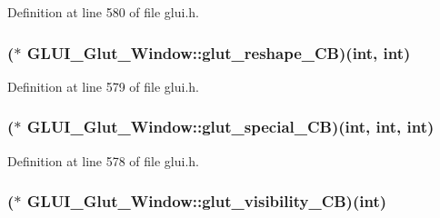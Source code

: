 Definition at line 580 of file glui.\+h.

\hypertarget{class_g_l_u_i___glut___window_ab80f91ef7790e98a3fb96f5d2fc3bcad}{
\subsubsection[{glut\+\_\+reshape\+\_\+\+C\+B}]{($\ast$ G\+L\+U\+I\+\_\+\+Glut\+\_\+\+Window\+::glut\+\_\+reshape\+\_\+\+C\+B)({\bf int}, {\bf int})}}\label{class_g_l_u_i___glut___window_ab80f91ef7790e98a3fb96f5d2fc3bcad}


Definition at line 579 of file glui.\+h.

\hypertarget{class_g_l_u_i___glut___window_a6195cf472a03676f14c86e29a4d2ad5b}{
\subsubsection[{glut\+\_\+special\+\_\+\+C\+B}]{($\ast$ G\+L\+U\+I\+\_\+\+Glut\+\_\+\+Window\+::glut\+\_\+special\+\_\+\+C\+B)({\bf int}, {\bf int}, {\bf int})}}\label{class_g_l_u_i___glut___window_a6195cf472a03676f14c86e29a4d2ad5b}


Definition at line 578 of file glui.\+h.

\hypertarget{class_g_l_u_i___glut___window_aaf80a162394308539654d8451d25d49b}{
\subsubsection[{glut\+\_\+visibility\+\_\+\+C\+B}]{($\ast$ G\+L\+U\+I\+\_\+\+Glut\+\_\+\+Window\+::glut\+\_\+visibility\+\_\+\+C\+B)({\bf int})}}\label{class_g_l_u_i___glut___window_aaf80a162394308539654d8451d25d49b}


